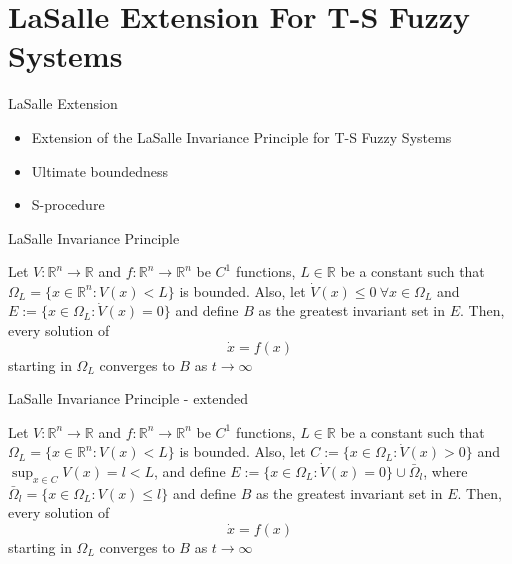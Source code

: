 

\section{LaSalle Extension For T-S Fuzzy Systems}
\begin{frame}{LaSalle Extension}
\begin{itemize}
    \item Extension of the LaSalle Invariance Principle \autocite{Alberto2000} for T-S Fuzzy Systems
    \item Ultimate boundedness \autocite{Valentino2019}
    \item S-procedure \autocite{Valentino2021}
\end{itemize}
\end{frame}

\begin{frame}{LaSalle Invariance Principle}
\begin{theorem}
Let $V:\mathbb{R}^n \rightarrow \mathbb{R}$ and $f:\mathbb{R}^n \rightarrow \mathbb{R}^n$ be $C^1$ functions, $L \in \mathbb{R}$ be a constant such that $\Omega_L = \{x \in \mathbb{R}^n: V(x) < L\}$ is bounded. Also, let $\dot{V}(x) \leq 0 ~\forall x \in \Omega_L$ and $E := \{ x \in \Omega_L: \dot{V}(x)=0\}$ and define $B$ as the greatest invariant set in $E$. Then, every solution of 
\begin{equation*}
    \dot{x} = f(x)
\end{equation*}
starting in $\Omega_L$ converges to $B$ as $t \rightarrow \infty$
\end{theorem}
\end{frame}

\begin{frame}{LaSalle Invariance Principle - extended}
\begin{theorem}
Let $V:\mathbb{R}^n \rightarrow \mathbb{R}$ and $f:\mathbb{R}^n \rightarrow \mathbb{R}^n$ be $C^1$ functions, $L \in \mathbb{R}$ be a constant such that $\Omega_L = \{x \in \mathbb{R}^n: V(x) < L\}$ is bounded. Also, let $C:= \{x \in \Omega_L: \dot{V}(x)>0\}$ and $\sup_{x \in C}V(x) = l<L$, and define $E := \{ x \in \Omega_L: \dot{V}(x)=0\} \cup \bar{\Omega}_l$, where $\bar{\Omega}_l = \{x \in \Omega_L:V(x) \leq l\}$ and define $B$ as the greatest invariant set in $E$. Then,
every solution of 
\begin{equation*}
    \dot{x} = f(x)
\end{equation*}
starting in $\Omega_L$ converges to $B$ as $t \rightarrow \infty$
\end{theorem}
\end{frame}

